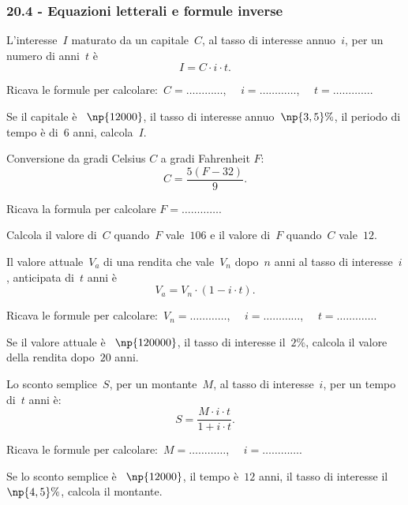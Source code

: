 \subsubsection*{20.4 - Equazioni letterali e formule inverse}

\begin{esercizio}
\label{ese:20.53}
L'interesse~$I$ maturato da un capitale~$C$, al tasso di interesse annuo~$i$, per un numero di anni~$t$ è
\begin{equation*}
  I=C\cdot i\cdot t.
\end{equation*}

Ricava le formule per calcolare:~$C=\ldots\ldots\ldots\ldots$, $\quad i=\ldots\ldots\ldots\ldots$, $\quad t =\ldots\ldots\ldots\ldots$.

Se il capitale è \officialeuro~$\np{12000}$, il tasso di interesse annuo~$\np{3,5}\%$, il periodo di tempo è di~$6$ anni, calcola~$I$.
\end{esercizio}

\begin{esercizio}
\label{ese:20.54}
Conversione da gradi Celsius $C$ a gradi Fahrenheit $F$:
\begin{equation*}
  C=\frac{5(F-32)}{9}.
\end{equation*}

Ricava la formula per calcolare $F=\ldots\ldots\ldots\ldots$.

Calcola il valore di~$C$ quando~$F$ vale~$106$ e il valore di~$F$ quando~$C$ vale~$12$.
\end{esercizio}

\begin{esercizio}
\label{ese:20.55}
Il valore attuale~$V_a$ di una rendita che vale~$V_n$ dopo~$n$ anni al tasso di interesse~$i$, anticipata di~$t$ anni è
\begin{equation*}
  V_{a}=V_{n}\cdot (1-i\cdot t).
\end{equation*}

Ricava le formule per calcolare:~$V_n=\ldots\ldots\ldots\ldots$, $\quad i=\ldots\ldots\ldots\ldots$, $\quad t =\ldots\ldots\ldots\ldots$.

Se il valore attuale è \officialeuro~$\np{120000}$, il tasso di interesse il~$2\%$, calcola il valore della rendita dopo~$20$ anni.
\end{esercizio}

\begin{esercizio}
\label{ese:20.56}
Lo sconto semplice~$S$, per un montante~$M$, al tasso di interesse~$i$, per un tempo di~$t$ anni è:
\begin{equation*}
  S=\frac{M\cdot i\cdot t}{1+i\cdot t}.
\end{equation*}

Ricava le formule per calcolare:~$M=\ldots\ldots\ldots\ldots$, $\quad i=\ldots\ldots\ldots\ldots$.

Se lo sconto semplice è \officialeuro~$\np{12000}$, il tempo è~$12$ anni, il tasso di interesse il~$\np{4,5}\%$, calcola il montante.
\end{esercizio}

